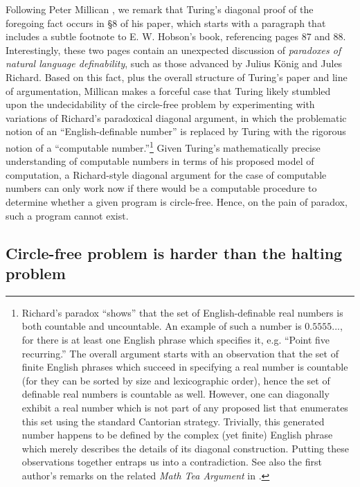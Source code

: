\documentclass[12pt]{amsart}
\begin{document}
Following Peter Millican \cite{millican2021turing}, we remark that Turing's diagonal proof of the foregoing fact occurs in §8 of his paper, which starts with a paragraph that includes a subtle footnote to E. W. Hobson's \cite{hobson1921theory} book, referencing pages 87 and 88. Interestingly, these two pages contain an unexpected discussion of \textit{paradoxes of natural language definability}, such as those advanced by Julius König and Jules Richard. Based on this fact, plus the overall structure of Turing's paper and line of argumentation, Millican makes a forceful case that Turing likely stumbled upon the undecidability of the circle-free problem by experimenting with variations of Richard's paradoxical diagonal argument, in which the problematic notion of an \enquote{English-definable number} is replaced by Turing with the rigorous notion of a \enquote{computable number.}\footnote{Richard's paradox \enquote{shows} that the set of English-definable real numbers is both countable and uncountable. An example of such a number is $0.5555...$, for there is at least one English phrase which specifies it, e.g. \enquote{Point five recurring.} The overall argument starts with an observation that the set of finite English phrases which succeed in specifying a real number is countable (for they can be sorted by size and lexicographic order), hence the set of definable real numbers is countable as well. However, one can diagonally exhibit a real number which is not part of any proposed list that enumerates this set using the standard Cantorian strategy. Trivially, this generated number happens to be defined by the complex (yet finite) English phrase which merely describes the details of its diagonal construction. Putting these observations together entraps us into a contradiction. See also the first author's remarks on the related \emph{Math Tea Argument} in \cite{HamkinsLinetskyReitz2013:PointwiseDefinableModelsOfSetTheory}.} Given Turing's mathematically precise understanding of computable numbers in terms of his proposed model of computation, a Richard-style diagonal argument for the case of computable numbers can only work now if there would be a computable procedure to determine whether a given program is circle-free. 
Hence, on the pain of paradox, such a program cannot exist.\goodbreak

\subsection{Circle-free problem is harder than the halting problem}
\end{document}
